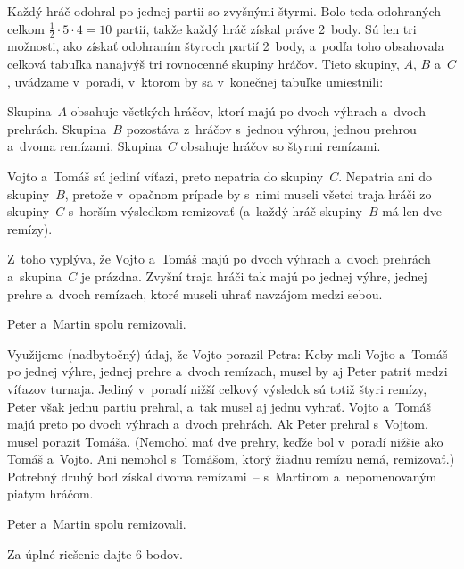 {%
Každý hráč odohral po jednej partii so zvyšnými štyrmi. Bolo teda
odohraných celkom $\frac12\cdot 5 \cdot 4 = 10$
partií, takže každý hráč získal práve 2~body.
Sú len tri možnosti, ako získať odohraním štyroch partií 2~body,
a~podľa toho obsahovala celková tabuľka nanajvýš tri rovnocenné
skupiny hráčov. Tieto skupiny, $A$, $B$ a~$C$, uvádzame v~poradí, v~ktorom by sa
v~konečnej tabuľke umiestnili:

Skupina~$A$ obsahuje všetkých hráčov, ktorí majú po dvoch výhrach a~dvoch
prehrách. Skupina~$B$ pozostáva z~hráčov s~jednou výhrou, jednou prehrou
a~dvoma remízami. Skupina~$C$ obsahuje hráčov so štyrmi remízami.

Vojto a~Tomáš sú jediní víťazi, preto nepatria do skupiny~$C$. Nepatria
ani do skupiny~$B$, pretože v~opačnom prípade by s~nimi museli všetci traja hráči zo skupiny~$C$
s~horším výsledkom remizovať (a~každý hráč skupiny~$B$ má
len dve remízy).

Z~toho vyplýva, že Vojto a~Tomáš majú po dvoch výhrach a~dvoch prehrách
a~skupina~$C$ je prázdna. Zvyšní traja hráči tak majú po jednej výhre, jednej
prehre a~dvoch remízach, ktoré museli uhrať navzájom medzi sebou.

\zaver
Peter a~Martin spolu remizovali.

\ineriesenie
Využijeme (nadbytočný) údaj, že Vojto porazil Petra:
Keby mali Vojto a~Tomáš po jednej výhre, jednej prehre a~dvoch remízach,
musel by aj Peter patriť medzi víťazov turnaja. Jediný v~poradí nižší
celkový výsledok sú totiž štyri remízy, Peter však jednu partiu
prehral, a~tak musel aj jednu vyhrať.
Vojto a~Tomáš majú preto po dvoch výhrach a~dvoch prehrách. Ak
Peter prehral s~Vojtom, musel poraziť Tomáša. (Nemohol mať dve prehry,
keďže bol v~poradí nižšie ako Tomáš a~Vojto. Ani nemohol s~Tomášom,
ktorý žiadnu remízu nemá, remizovať.) Potrebný druhý bod získal dvoma
remízami~-- s~Martinom a~nepomenovaným piatym hráčom.

\zaver
Peter a~Martin spolu remizovali.



\nobreak\medskip\petit\noindent
Za úplné riešenie dajte 6 bodov.

\endpetit
\bigbreak
}

